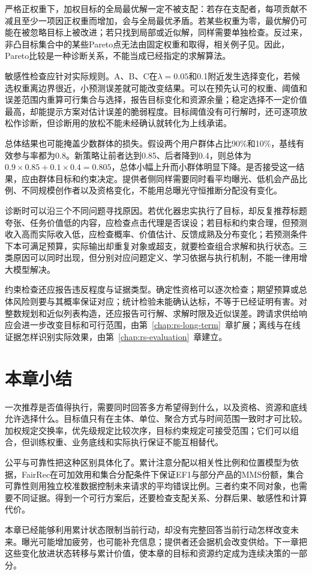 严格正权重下，加权目标的全局最优解一定不被支配：若存在支配者，每项贡献不减且至少一项因正权重而增加，会与全局最优矛盾。若某些权重为零，最优解仍可能在被忽略目标上被改进；若只找到局部或近似解，同样需要单独检查。反过来，非凸目标集合中的某些Pareto点无法由固定权重和取得，相关例子见。因此，Pareto比较是一种诊断关系，不能当成已经指定的求解算法。

敏感性检查应针对实际规则。A、B、C在$\lambda=0.05$和0.1附近发生选择变化，若候选权重离边界很近，小预测误差就可能改变结果。可以在预先认可的权重、阈值和误差范围内重算可行集合与选择，报告目标变化和资源余量；稳定选择不一定价值最高，却能提示方案对估计误差的脆弱程度。目标阈值没有可行解时，还可逐项放松作诊断，但诊断用的放松不能未经确认就转化为上线承诺。

总体结果也可能掩盖少数群体的损失。假设两个用户群体占比90\%和10\%，基线有效参与率都为0.8。新策略让前者达到0.85、后者降到0.4，则总体为$0.9\times0.85+0.1\times0.4=0.805$，总体小幅上升而小群体明显下降。是否接受这一结果，应由群体目标和约束决定。提供者侧同样需要同时看平均曝光、低机会产品比例、不同规模创作者以及资格变化，不能用总曝光守恒推断分配没有变化。

诊断时可以沿三个不同问题寻找原因。若优化器忠实执行了目标，却反复推荐标题夸张、任务价值低的内容，应检查点击代理是否误设；若目标和约束合理，但预测收入高而实际收入低，应检查概率、价值估计、反馈成熟及分布变化；若预测条件下本可满足预算，实际输出却重复对象或超支，就要检查组合求解和执行状态。三类原因可以同时出现，但分别对应问题定义、学习依据与执行机制，不能一律用增大模型解决。

约束检查还应报告违反程度与证据类型。确定性资格可以逐次检查；期望预算或总体风险则要与其概率保证对应；统计检验未能确认达标，不等于已经证明有害。对整数规划和近似列表构造，还应报告可行解、求解时限及近似误差。跨请求供给响应会进一步改变目标和可行范围，由第~\ref{chap:rs-long-term}~章扩展；离线与在线证据怎样识别实际效果，由第~\ref{chap:rs-evaluation}~章建立。

\section{本章小结}
\label{sec:rs-constraints-summary}

一次推荐是否值得执行，需要同时回答多方希望得到什么，以及资格、资源和底线允许选择什么。目标值只有在主体、单位、聚合方式与时间范围一致时才可比较。加权规定交换率，优先级规定比较次序，目标约束规定可接受范围；它们可以组合，但训练权重、业务底线和实际执行保证不能互相替代。

公平与可靠性把这种区别具体化了。累计注意分配以相关性比例和位置模型为依据，FairRec在可加效用和集合分配条件下保证EF1与部分产品的MMS份额，集合可靠性则用独立校准数据控制未来请求的平均错误比例。三者约束不同对象，也需要不同证据。得到一个可行方案后，还要检查支配关系、分群后果、敏感性和计算代价。

本章已经能够利用累计状态限制当前行动，却没有完整回答当前行动怎样改变未来。曝光可能增加疲劳，也可能补充信息；提供者还会据机会改变供给。下一章把这些变化放进状态转移与累计价值，使本章的目标和资源约定成为连续决策的一部分。
